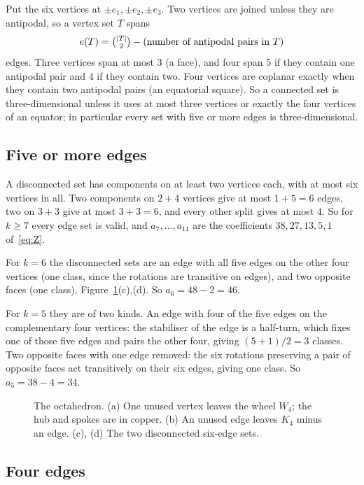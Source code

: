 \documentclass[11pt]{amsart}
\theoremstyle{remark}
\begin{document}
Put the six vertices at $\pm e_1,\pm e_2,\pm e_3$. Two vertices are joined unless they are antipodal, so a vertex set $T$ spans
\[
e(T)=\tbinom{|T|}2-(\text{number of antipodal pairs in }T)
\]
edges. Three vertices span at most $3$ (a face), and four span $5$ if they contain one antipodal pair and $4$ if they contain two. Four vertices are coplanar exactly when they contain two antipodal pairs (an equatorial square). So a connected set is three-dimensional unless it uses at most three vertices or exactly the four vertices of an equator; in particular every set with five or more edges is three-dimensional.

\subsection{Five or more edges}

A disconnected set has components on at least two vertices each, with at most six vertices in all. Two components on $2+4$ vertices give at most $1+5=6$ edges, two on $3+3$ give at most $3+3=6$, and every other split gives at most $4$. So for $k\ge7$ every edge set is valid, and $a_7,\dots,a_{11}$ are the coefficients $38,27,13,5,1$ of~\eqref{eq:Z}.

For $k=6$ the disconnected sets are an edge with all five edges on the other four vertices (one class, since the rotations are transitive on edges), and two opposite faces (one class), Figure~\ref{fig:oct}(c),(d). So $a_6=48-2=46$.

For $k=5$ they are of two kinds. An edge with four of the five edges on the complementary four vertices: the stabiliser of the edge is a half-turn, which fixes one of those five edges and pairs the other four, giving $(5+1)/2=3$ classes. Two opposite faces with one edge removed: the six rotations preserving a pair of opposite faces act transitively on their six edges, giving one class. So $a_5=38-4=34$.

\begin{figure}[ht]
\centering

\caption{The octahedron. (a) One unused vertex leaves the wheel $W_4$; the hub and spokes are in copper. (b) An unused edge leaves $K_4$ minus an edge. (c), (d) The two disconnected six-edge sets.}
\label{fig:oct}
\end{figure}

\subsection{Four edges}
\end{document}
